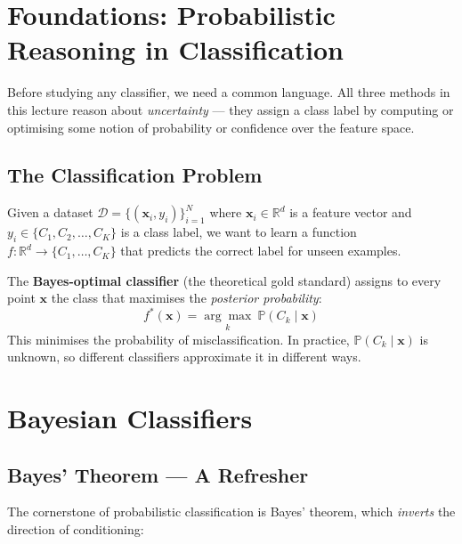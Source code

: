 \documentclass[12pt,a4paper]{article}
\newcommand{\Prob}{\mathbb{P}}
\newcommand{\R}{\mathbb{R}}
\newcommand{\x}{\mathbf{x}}
\begin{document}
\tableofcontents
\newpage

\section{Foundations: Probabilistic Reasoning in Classification}

Before studying any classifier, we need a common language. All three methods in this lecture reason about \emph{uncertainty} — they assign a class label by computing or optimising some notion of probability or confidence over the feature space.

\subsection{The Classification Problem}

Given a dataset $\mathcal{D} = \{(\x_i, y_i)\}_{i=1}^{N}$ where $\x_i \in \R^d$ is a feature vector and $y_i \in \{C_1, C_2, \ldots, C_K\}$ is a class label, we want to learn a function $f: \R^d \to \{C_1,\ldots,C_K\}$ that predicts the correct label for unseen examples.

\begin{tcolorbox}[defbox, title={Definition: Optimal Classifier}]
The \textbf{Bayes-optimal classifier} (the theoretical gold standard) assigns to every point $\x$ the class that maximises the \emph{posterior probability}:
\[
  f^*(\x) = \underset{k}{\arg\max}\ \Prob(C_k \mid \x)
\]
This minimises the probability of misclassification. In practice, $\Prob(C_k \mid \x)$ is unknown, so different classifiers approximate it in different ways.
\end{tcolorbox}

\section{Bayesian Classifiers}

\subsection{Bayes' Theorem — A Refresher}

The cornerstone of probabilistic classification is Bayes' theorem, which \emph{inverts} the direction of conditioning:
\end{document}
